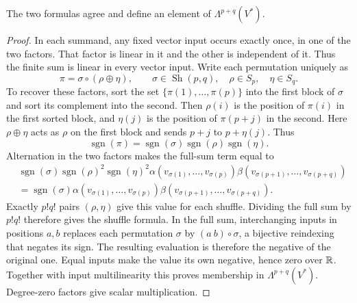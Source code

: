 \begin{proposition}
\label{prop:shuffle-well-defined}
The two formulas agree and define an element of $\Lambda^{p+q}(V^*)$.
\end{proposition}
\begin{proof}
In each summand, any fixed vector input occurs exactly once, in one of
the two factors. That factor is linear in it and the other is independent
of it. Thus the finite sum is linear in every vector input.
Write each permutation uniquely as
\[
\pi=\sigma\circ(\rho\oplus\eta),\qquad
\sigma\in\operatorname{Sh}(p,q),\quad\rho\in S_p,\quad\eta\in S_q.
\]
To recover these factors, sort the set $\{\pi(1),\ldots,\pi(p)\}$ into
the first block of $\sigma$ and sort its complement into the second.
Then $\rho(i)$ is the position of $\pi(i)$ in the first sorted block,
and $\eta(j)$ is the position of $\pi(p+j)$ in the second.
Here $\rho\oplus\eta$ acts as $\rho$ on the first block and sends
$p+j$ to $p+\eta(j)$. Thus
\[
\operatorname{sgn}(\pi)=\operatorname{sgn}(\sigma)
\operatorname{sgn}(\rho)\operatorname{sgn}(\eta).
\]
Alternation in the two factors makes the full-sum term equal to
\[
\begin{aligned}
&\operatorname{sgn}(\sigma)\operatorname{sgn}(\rho)^2
\operatorname{sgn}(\eta)^2
\alpha(v_{\sigma(1)},\ldots,v_{\sigma(p)})
\beta(v_{\sigma(p+1)},\ldots,v_{\sigma(p+q)})\\
&=\operatorname{sgn}(\sigma)
\alpha(v_{\sigma(1)},\ldots,v_{\sigma(p)})
\beta(v_{\sigma(p+1)},\ldots,v_{\sigma(p+q)}).
\end{aligned}
\]
Exactly $p!q!$ pairs $(\rho,\eta)$ give this value for each shuffle.
Dividing the full sum by $p!q!$ therefore gives the shuffle formula.
In the full sum, interchanging inputs in positions $a,b$ replaces each
permutation $\sigma$ by $(a\ b)\circ\sigma$, a bijective reindexing that
negates its sign. The resulting evaluation is therefore the negative of
the original one. Equal inputs make the value its own negative, hence
zero over $\mathbb{R}$. Together with input multilinearity this proves membership
in $\Lambda^{p+q}(V^*)$. Degree-zero factors give scalar multiplication.
\end{proof}

